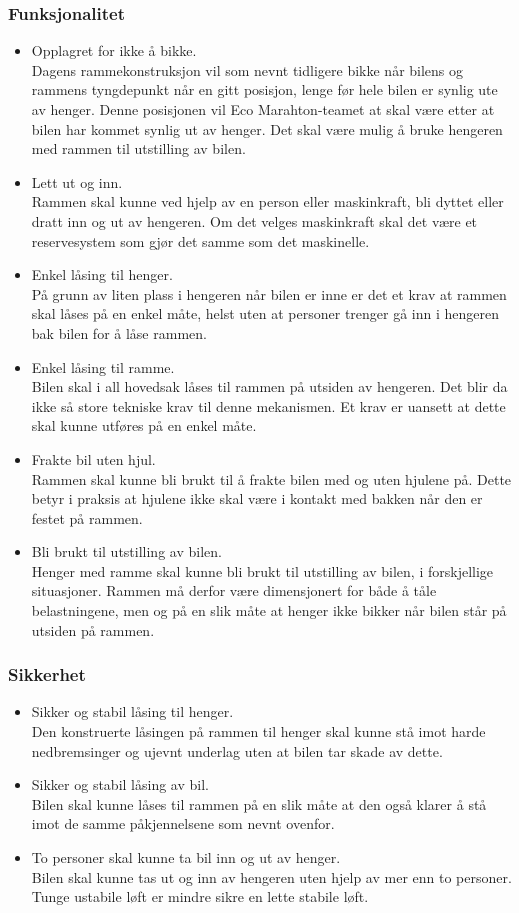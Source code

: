 \subsubsection{Funksjonalitet}
\begin{itemize}
\item Opplagret for ikke å bikke. \\
Dagens rammekonstruksjon vil som nevnt tidligere bikke når bilens og rammens tyngdepunkt når en gitt posisjon, lenge før hele bilen er synlig ute av henger. Denne posisjonen vil Eco Marahton-teamet at skal være etter at bilen har kommet synlig ut av henger. Det skal være mulig å bruke hengeren med rammen til utstilling av bilen. 
\item Lett ut og inn. \\
Rammen skal kunne ved hjelp av en person eller maskinkraft, bli dyttet eller dratt inn og ut av hengeren. Om det velges maskinkraft skal det være et reservesystem som gjør det samme som det maskinelle. 
\item Enkel låsing til henger. \\
På grunn av liten plass i hengeren når bilen er inne er det et krav at rammen skal låses på en enkel måte, helst uten at personer trenger gå inn i hengeren bak bilen for å låse rammen. 
\item Enkel låsing til ramme. \\
Bilen skal i all hovedsak låses til rammen på utsiden av hengeren. Det blir da ikke så store tekniske krav til denne mekanismen. Et krav er uansett at dette skal kunne utføres på en enkel måte.
\item Frakte bil uten hjul. \\
Rammen skal kunne bli brukt til å frakte bilen med og uten hjulene på. Dette betyr i praksis at hjulene ikke skal være i kontakt med bakken når den er festet på rammen. 
\item Bli brukt til utstilling av bilen. \\
Henger med ramme skal kunne bli brukt til utstilling av bilen, i forskjellige situasjoner. Rammen må derfor være dimensjonert for både å tåle belastningene, men og på en slik måte at henger ikke bikker når bilen står på utsiden på rammen.
\end{itemize}
\subsubsection{Sikkerhet}
\begin{itemize}
\item Sikker og stabil låsing til henger. \\
Den konstruerte låsingen på rammen til henger skal kunne stå imot harde nedbremsinger og ujevnt underlag uten at bilen tar skade av dette.  
\item Sikker og stabil låsing av bil. \\
Bilen skal kunne låses til rammen på en slik måte at den også klarer å stå imot de samme påkjennelsene som nevnt ovenfor.
\item To personer skal kunne ta bil inn og ut av henger. \\
Bilen skal kunne tas ut og inn av hengeren uten hjelp av mer enn to personer. Tunge ustabile løft er mindre sikre en lette stabile løft.  
\end{itemize}
